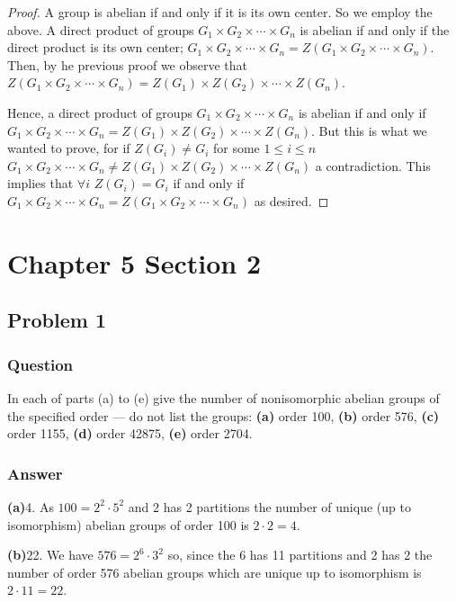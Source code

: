 \documentclass[12pt]{article}
\begin{document}
\begin{proof}A group is abelian if and only if it is its own center. So we employ the above. A direct product of groups $G_1 \times G_2 \times \cdots \times G_n$ is abelian if and only if the direct product is its own center; $G_1 \times G_2 \times \cdots \times G_n=Z(G_1 \times G_2 \times \cdots \times G_n)$. Then, by he previous proof we observe that $Z(G_1 \times G_2 \times \cdots \times G_n) = Z(G_1) \times Z(G_2) \times \cdots \times Z(G_n)$. 

Hence, a direct product of groups $G_1 \times G_2 \times \cdots \times G_n$ is abelian if and only if $G_1 \times G_2 \times \cdots \times G_n = Z(G_1) \times Z(G_2) \times \cdots \times Z(G_n)$. But this is what we wanted to prove, for if $Z(G_i) \neq G_i$ for some $1 \leq i \leq n$  $G_1 \times G_2 \times \cdots \times G_n \neq Z(G_1) \times Z(G_2) \times \cdots \times Z(G_n)$ a contradiction. This implies that $\forall i$ $Z(G_i)=G_i$ if and only if $G_1 \times G_2 \times \cdots \times G_n=Z(G_1 \times G_2 \times \cdots \times G_n)$ as desired.\end{proof}


\section{Chapter 5 Section 2}

\subsection{Problem 1}

\subsubsection{Question}

In each of parts (a) to (e) give the number of nonisomorphic abelian groups of the specified order --- do not list the groups: \textbf{(a)} order 100, \textbf{(b)} order 576, \textbf{(c)} order 1155, \textbf{(d)} order 42875, \textbf{(e)} order 2704.

\subsubsection{Answer}
\textbf{(a)}4. As $100=2^2 \cdot 5^2$ and 2 has 2 partitions the number of unique (up to isomorphism) abelian groups of order 100 is $2 \cdot 2 = 4$.


\textbf{(b)}22. We have $576=2^6 \cdot 3^2$ so, since the 6 has 11 partitions and 2 has 2 the number of order 576 abelian groups which are unique up to isomorphism is $2 \cdot 11=22$.
\end{document}
